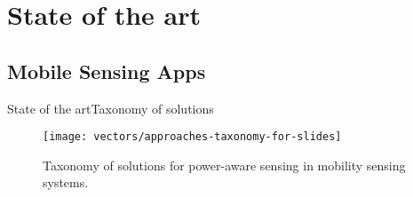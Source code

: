 \section{State of the art}
\subsection{Mobile Sensing Apps}
\begin{frame}{State of the art}{Taxonomy of solutions}

\begin{figure}
  \centering
  \texttt{[image: vectors/approaches-taxonomy-for-slides]}
  \caption{Taxonomy of solutions for power-aware sensing in mobility sensing systems.}
\end{figure}
\end{frame}


